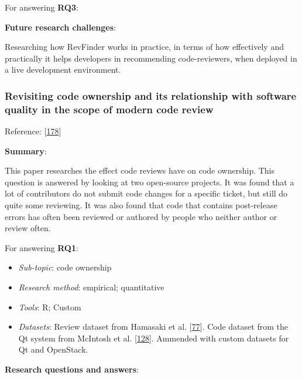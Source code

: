 \documentclass[]{book}
\providecommand{\tightlist}{%
  \setlength{\itemsep}{0pt}\setlength{\parskip}{0pt}}
\begin{document}
For answering \textbf{RQ3}:

\textbf{Future research challenges}:

Researching how RevFinder works in practice, in terms of how effectively
and practically it helps developers in recommending code-reviewers, when
deployed in a live development environment.

\subsubsection{Revisiting code ownership and its relationship with
software quality in the scope of modern code
review}\label{revisiting-code-ownership-and-its-relationship-with-software-quality-in-the-scope-of-modern-code-review}

Reference: {[}\protect\hyperlink{ref-thongtanunam2016revisiting}{178}{]}

\textbf{Summary}:

This paper researches the effect code reviews have on code ownership.
This question is answered by looking at two open-source projects. It was
found that a lot of contributors do not submit code changes for a
specific ticket, but still do quite some reviewing. It was also found
that code that contains post-release errors has often been reviewed or
authored by people who neither author or review often.

For answering \textbf{RQ1}:

\begin{itemize}
\tightlist
\item
  \emph{Sub-topic}: code ownership
\item
  \emph{Research method}: empirical; quantitative
\item
  \emph{Tools}: R; Custom
\item
  \emph{Datasets}: Review dataset from Hamasaki et al.
  {[}\protect\hyperlink{ref-hamasaki2013does}{77}{]}. Code dataset from
  the Qt system from McIntosh et al.
  {[}\protect\hyperlink{ref-mcintosh2014impact}{128}{]}. Ammended with
  custom datasets for Qt and OpenStack.
\end{itemize}

\textbf{Research questions and answers}:
\end{document}
